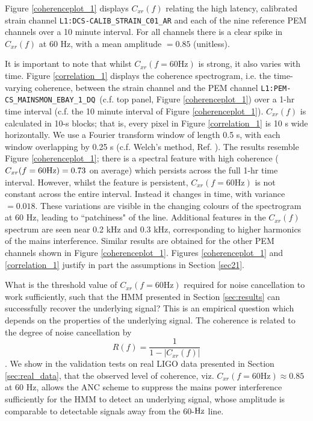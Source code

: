 \documentclass[pra,superscriptaddress,reprint,amsmath,amssymb,nofootinbib]{revtex4-2}
\newcommand{\PEMChanName}{\texttt{L1:PEM-CS\_MAINSMON\_EBAY\_1\_DQ}}
\begin{document}
Figure \ref{coherenceplot_1} displays $C_{xr}(f)$ relating the high latency, calibrated strain channel \texttt{L1:DCS-CALIB\_STRAIN\_C01\_AR} and each of the nine reference PEM channels over a 10 minute interval. For all channels there is a clear spike in $C_{xr}(f)$ at 60 Hz, with a mean amplitude $=0.85$ (unitless). \newline 

 It is important to note that whilst $C_{xr}(f=60 \text{Hz})$ is strong, it also varies with time. Figure \ref{correlation_1} displays the coherence spectrogram, i.e. the time-varying coherence, between the strain channel and the PEM channel \PEMChanName \, (c.f. top panel, Figure \ref{coherenceplot_1}) over a 1-hr time interval (c.f. the 10 minute interval of Figure \ref{coherenceplot_1}). $C_{xr}(f)$ is calculated in 10-s blocks; that is, every pixel in Figure \ref{correlation_1} is 10 s wide horizontally. We use a Fourier transform window of length 0.5 s, with each window overlapping by 0.25 s (c.f. Welch's method, Ref. \citep{Welch1161901}). The results resemble Figure \ref{coherenceplot_1}; there is a spectral feature with high coherence ($C_{xr}(f=60 \rm Hz) = 0.73$ on average) which persists across the full 1-hr time interval. However, whilst the feature is persistent, $C_{xr}(f=60 \text{Hz})$ is not constant across the entire interval. Instead it changes in time, with variance $=0.018$. These variations are visible in the changing colours of the spectrogram at 60 Hz, leading to ``patchiness" of the line. Additional features in the $C_{xr}(f)$ spectrum are seen near 0.2 kHz and 0.3 kHz, corresponding to higher harmonics of the mains interference. Similar results are obtained for the other PEM channels shown in Figure \ref{coherenceplot_1}. Figures  \ref{coherenceplot_1} and  \ref{correlation_1} justify in part the assumptions in Section \ref{sec21}. \newline 
 
 
What is the threshold value of $C_{xr}(f=60 \text{Hz})$ required for noise cancellation to work sufficiently, such that the HMM presented in Section \ref {sec:results} can successfully recover the underlying signal? This is an empirical question which depends on the properties of the underlying signal. The coherence is related to the degree of noise cancellation by
 \begin{equation}
	R(f) = \frac{1}{1 - |C_{xr}(f)|}
\end{equation} 
 \cite{s22176591,625628}.  We show in the validation tests on real LIGO data presented in Section \ref{sec:real_data}, that the observed level of coherence, viz. $C_{xr}(f=60 \text{Hz}) \approx 0.85$ at 60 Hz, allows the ANC scheme to suppress the mains power interference sufficiently for the HMM to detect an underlying signal, whose amplitude is comparable to detectable signals away from the 60-${\rm Hz}$ line.
\end{document}
